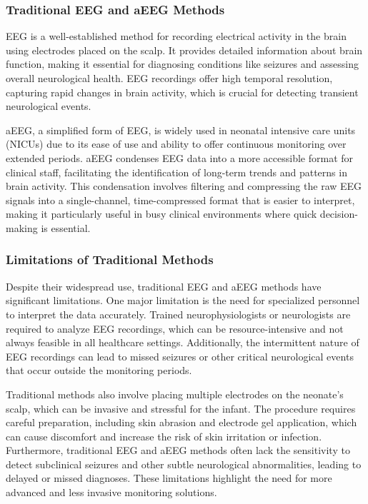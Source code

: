\documentclass[12pt,journal,compsoc]{IEEEtran}
\begin{document}
\subsubsection{Traditional EEG and aEEG Methods}

EEG is a well-established method for recording electrical activity in the brain using electrodes placed on the scalp. It provides detailed information about brain function, making it essential for diagnosing conditions like seizures and assessing overall neurological health. EEG recordings offer high temporal resolution, capturing rapid changes in brain activity, which is crucial for detecting transient neurological events.

aEEG, a simplified form of EEG, is widely used in neonatal intensive care units (NICUs) due to its ease of use and ability to offer continuous monitoring over extended periods. aEEG condenses EEG data into a more accessible format for clinical staff, facilitating the identification of long-term trends and patterns in brain activity. This condensation involves filtering and compressing the raw EEG signals into a single-channel, time-compressed format that is easier to interpret, making it particularly useful in busy clinical environments where quick decision-making is essential.

\subsubsection{Limitations of Traditional Methods}

Despite their widespread use, traditional EEG and aEEG methods have significant limitations. One major limitation is the need for specialized personnel to interpret the data accurately. Trained neurophysiologists or neurologists are required to analyze EEG recordings, which can be resource-intensive and not always feasible in all healthcare settings. Additionally, the intermittent nature of EEG recordings can lead to missed seizures or other critical neurological events that occur outside the monitoring periods.

Traditional methods also involve placing multiple electrodes on the neonate's scalp, which can be invasive and stressful for the infant. The procedure requires careful preparation, including skin abrasion and electrode gel application, which can cause discomfort and increase the risk of skin irritation or infection. Furthermore, traditional EEG and aEEG methods often lack the sensitivity to detect subclinical seizures and other subtle neurological abnormalities, leading to delayed or missed diagnoses. These limitations highlight the need for more advanced and less invasive monitoring solutions.
\end{document}
